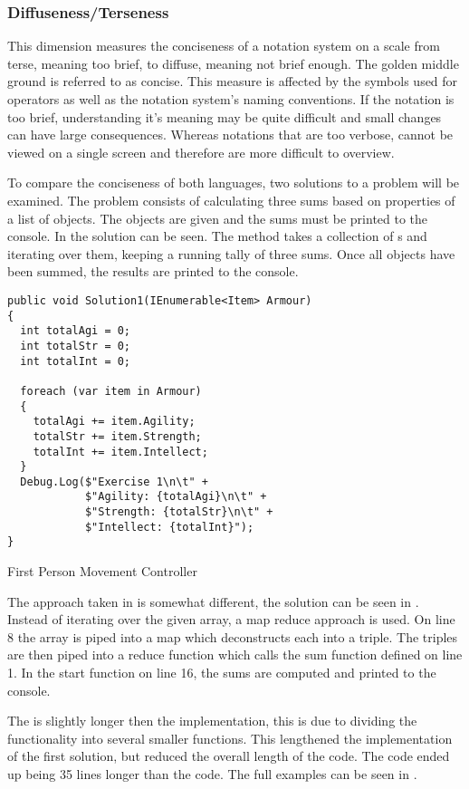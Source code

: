 \subsubsection{Diffuseness/Terseness}
This dimension measures the conciseness of a notation system on a scale from terse, meaning too brief, to diffuse, meaning not brief enough. The golden middle ground is referred to as concise. This measure is affected by the symbols used for operators as well as the notation system's naming conventions. If the notation is too brief, understanding it's meaning may be quite difficult and small changes can have large consequences. Whereas notations that are too verbose, cannot be viewed on a single screen and therefore are more difficult to overview.

To compare the conciseness of both languages, two solutions to a problem will be examined. The problem consists of calculating three sums based on properties of a list of objects. The objects are given and the sums must be printed to the console. In  the \cs solution can be seen. The method takes a collection of s and iterating over them, keeping a running tally of three sums. Once all objects have been summed, the results are printed to the console.

\begin{listing}[H]
\begin{verbatim}
public void Solution1(IEnumerable<Item> Armour)
{
  int totalAgi = 0;
  int totalStr = 0;
  int totalInt = 0;

  foreach (var item in Armour)
  {
    totalAgi += item.Agility;
    totalStr += item.Strength;
    totalInt += item.Intellect;
  }
  Debug.Log($"Exercise 1\n\t" +
            $"Agility: {totalAgi}\n\t" +
            $"Strength: {totalStr}\n\t" +
            $"Intellect: {totalInt}");
}
\end{verbatim}
\caption{First Person Movement Controller \cs}
\label{lst:cs-armour}
\end{listing}

The approach taken in \fs is somewhat different, the solution can be seen in . Instead of iterating over the given array, a map reduce approach is used. On line 8 the array is piped into a map which deconstructs each  into a triple. The triples are then piped into a reduce function which calls the sum function defined on line 1. In the start function on line 16, the sums are computed and printed to the console.

The \fs is slightly longer then the \cs implementation, this is due to dividing the functionality into several smaller functions. This lengthened the implementation of the first solution, but reduced the overall length of the code. The \cs code ended up being 35 lines longer than the \fs code. The full examples can be seen in .

